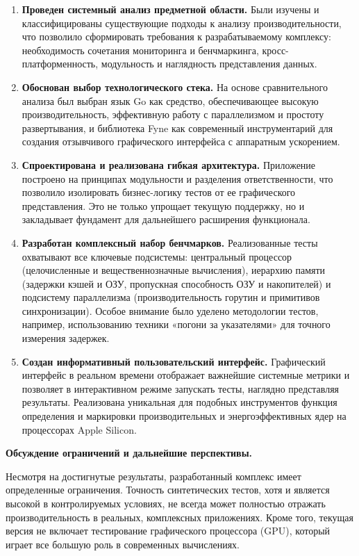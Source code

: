 \begin{enumerate}
    \item \textbf{Проведен системный анализ предметной области.} Были изучены и классифицированы существующие подходы к анализу производительности, что позволило сформировать требования к разрабатываемому комплексу: необходимость сочетания мониторинга и бенчмаркинга, кросс-платформенность, модульность и наглядность представления данных.

    \item \textbf{Обоснован выбор технологического стека.} На основе сравнительного анализа был выбран язык Go как средство, обеспечивающее высокую производительность, эффективную работу с параллелизмом и простоту развертывания, и библиотека Fyne как современный инструментарий для создания отзывчивого графического интерфейса с аппаратным ускорением.

    \item \textbf{Спроектирована и реализована гибкая архитектура.} Приложение построено на принципах модульности и разделения ответственности, что позволило изолировать бизнес-логику тестов от ее графического представления. Это не только упрощает текущую поддержку, но и закладывает фундамент для дальнейшего расширения функционала.

    \item \textbf{Разработан комплексный набор бенчмарков.} Реализованные тесты охватывают все ключевые подсистемы: центральный процессор (целочисленные и вещественнозначные вычисления), иерархию памяти (задержки кэшей и ОЗУ, пропускная способность ОЗУ и накопителей) и подсистему параллелизма (производительность горутин и примитивов синхронизации). Особое внимание было уделено методологии тестов, например, использованию техники «погони за указателями» для точного измерения задержек.

    \item \textbf{Создан информативный пользовательский интерфейс.} Графический интерфейс в реальном времени отображает важнейшие системные метрики и позволяет в интерактивном режиме запускать тесты, наглядно представляя результаты. Реализована уникальная для подобных инструментов функция определения и маркировки производительных и энергоэффективных ядер на процессорах Apple Silicon.
\end{enumerate}

\textbf{Обсуждение ограничений и дальнейшие перспективы.}

Несмотря на достигнутые результаты, разработанный комплекс имеет определенные ограничения. Точность синтетических тестов, хотя и является высокой в контролируемых условиях, не всегда может полностью отражать производительность в реальных, комплексных приложениях. Кроме того, текущая версия не включает тестирование графического процессора (GPU), который играет все большую роль в современных вычислениях.

